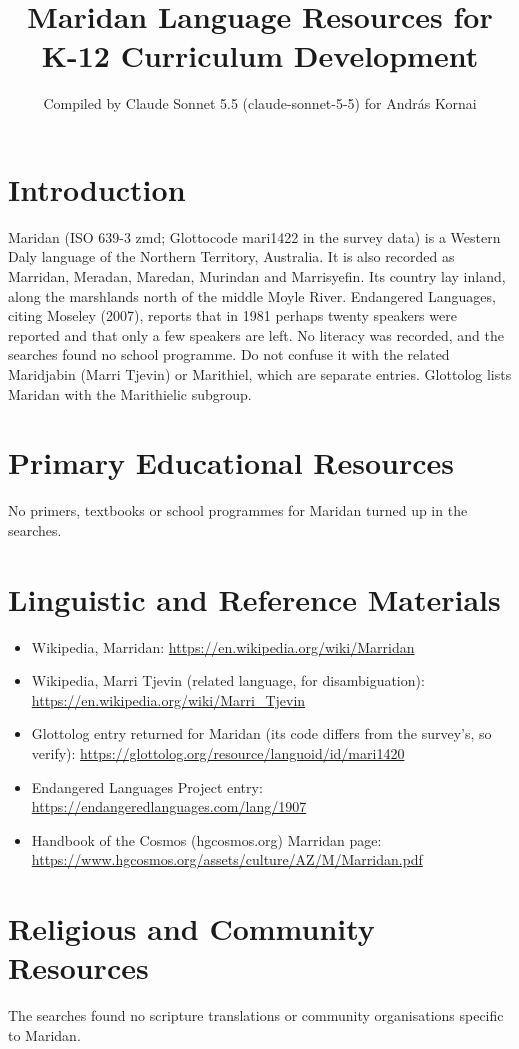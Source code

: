 \documentclass[12pt]{article}
\title{Maridan Language Resources for K-12 Curriculum Development}
\author{Compiled by Claude Sonnet 5.5 (claude-sonnet-5-5) for Andr\'as Kornai}
\date{}
\begin{document}
\maketitle

\section{Introduction}
Maridan (ISO 639-3 zmd; Glottocode mari1422 in the survey data) is a Western Daly language of the Northern Territory, Australia. It is also recorded as Marridan, Meradan, Maredan, Murindan and Marrisyefin. Its country lay inland, along the marshlands north of the middle Moyle River. Endangered Languages, citing Moseley (2007), reports that in 1981 perhaps twenty speakers were reported and that only a few speakers are left. No literacy was recorded, and the searches found no school programme. Do not confuse it with the related Maridjabin (Marri Tjevin) or Marithiel, which are separate entries. Glottolog lists Maridan with the Marithielic subgroup.

\section{Primary Educational Resources}
No primers, textbooks or school programmes for Maridan turned up in the searches.

\section{Linguistic and Reference Materials}
\begin{itemize}
\item Wikipedia, Marridan: \url{https://en.wikipedia.org/wiki/Marridan}
\item Wikipedia, Marri Tjevin (related language, for disambiguation): \url{https://en.wikipedia.org/wiki/Marri_Tjevin}
\item Glottolog entry returned for Maridan (its code differs from the survey's, so verify): \url{https://glottolog.org/resource/languoid/id/mari1420}
\item Endangered Languages Project entry: \url{https://endangeredlanguages.com/lang/1907}
\item Handbook of the Cosmos (hgcosmos.org) Marridan page: \url{https://www.hgcosmos.org/assets/culture/AZ/M/Marridan.pdf}
\end{itemize}

\section{Religious and Community Resources}
The searches found no scripture translations or community organisations specific to Maridan.
\end{document}
